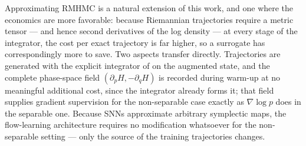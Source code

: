 \documentclass{article}
\theoremstyle{plain}
\theoremstyle{definition}
\theoremstyle{remark}
\begin{document}
Approximating RMHMC is a natural extension of this work, and one where the
economics are more favorable: because Riemannian trajectories require a metric
tensor --- and hence second derivatives of the log density --- at every stage of
the integrator, the cost per exact trajectory is far higher, so a surrogate has
correspondingly more to save. Two aspects transfer directly. Trajectories are
generated with the explicit integrator of \cite{Tao_2016} on the augmented
state, and the complete phase-space field $(\partial_p H, -\partial_q H)$ is
recorded during warm-up at no meaningful additional cost, since the integrator
already forms it; that field supplies gradient supervision for the
non-separable case exactly as $\nabla \log p$ does in the separable one.
Because SNNs approximate arbitrary symplectic maps, the flow-learning
architecture requires no modification whatsoever for the non-separable
setting --- only the source of the training trajectories changes.





\clearpage
\clearpage





\newpage
\appendix

\end{document}
